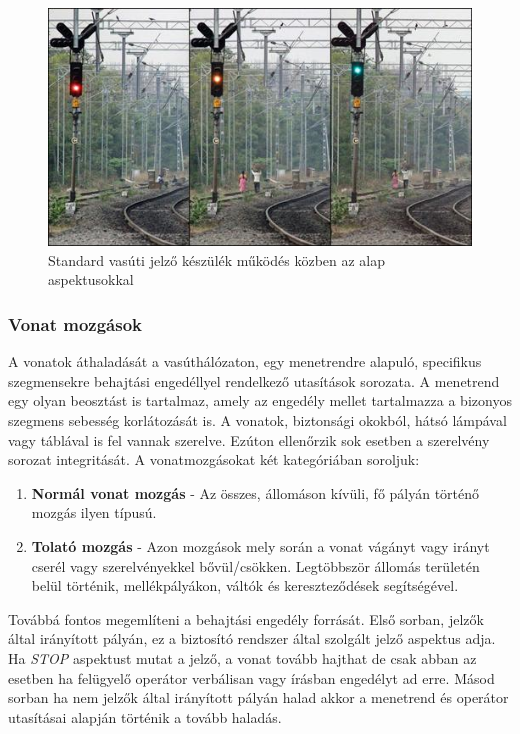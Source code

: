 \documentclass[a4paper,12pt]{article}
\begin{document}
\begin{figure}[htp]
	\centering
	\includegraphics[width=\linewidth]{images/rail_signal_aspects.png}
	\caption[Jelző készülék]{Standard vasúti jelző készülék működés közben az alap aspektusokkal}
\end{figure}

\subsubsection{Vonat mozgások}
A vonatok áthaladását a vasúthálózaton, egy menetrendre alapuló, specifikus szegmensekre behajtási engedéllyel rendelkező utasítások sorozata.
A menetrend egy olyan beosztást is tartalmaz, amely az engedély mellet tartalmazza a bizonyos szegmens sebesség korlátozását is.
A vonatok, biztonsági okokból, hátsó lámpával vagy táblával is fel vannak szerelve.
Ezúton ellenőrzik sok esetben a szerelvény sorozat integritását.
A vonatmozgásokat két kategóriában soroljuk:
\begin{enumerate}
	\item \textbf{Normál vonat mozgás} - Az összes, állomáson kívüli, fő pályán történő mozgás ilyen típusú. 
	\item \textbf{Tolató mozgás} - Azon mozgások mely során a vonat vágányt vagy irányt cserél vagy szerelvényekkel bővül/csökken.
	Legtöbbször állomás területén belül történik, mellékpályákon, váltók és kereszteződések segítségével.
\end{enumerate}
Továbbá fontos megemlíteni a behajtási engedély forrását. 
Első sorban, jelzők által irányított pályán, ez a biztosító rendszer által szolgált jelző aspektus adja.
Ha \textit{STOP} aspektust mutat a jelző, a vonat tovább hajthat de csak abban az esetben ha felügyelő operátor verbálisan vagy írásban engedélyt ad erre.
Másod sorban ha nem jelzők által irányított pályán halad akkor a menetrend és operátor utasításai alapján történik a tovább haladás.
\end{document}
